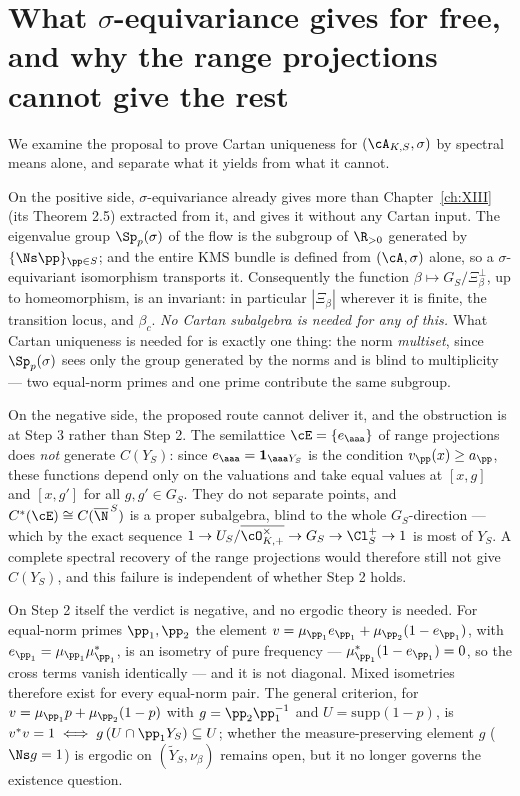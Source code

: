 \chapter[The spectral route to Cartan uniqueness]{What $\sigma$-equivariance gives for free,\\ and why the range projections cannot give the rest}\label{ch:XV}
\begin{summary}
We examine the proposal to prove Cartan uniqueness for $(\cA_{K,S},\sigma)$ by spectral means
alone, and separate what it yields from what it cannot.

On the positive side, $\sigma$-equivariance already gives more than Chapter~\ref{ch:XIII}
(its Theorem 2.5) extracted from it, and gives it without any Cartan input. The eigenvalue
group $\Sp_p(\sigma)$ of the flow is the subgroup of $\R_{>0}$ generated by
$\{\Ns\pp\}_{\pp\in S}$; and the entire $\mathrm{KMS}$
bundle is defined from $(\cA,\sigma)$ alone, so a $\sigma$-equivariant isomorphism transports
it. Consequently the function $\beta\mapsto G_S/\Xi_\beta^\perp$, up to homeomorphism, is an
invariant: in particular $|\Xi_\beta|$ wherever it is finite, the transition locus, and
$\beta_c$. \emph{No Cartan subalgebra is needed for any of this.} What Cartan uniqueness is
needed for is exactly one thing: the norm \emph{multiset}, since $\Sp_p(\sigma)$ sees only the
group generated by the norms and is blind to multiplicity --- two equal-norm primes and one
prime contribute the same subgroup.

On the negative side, the proposed route cannot deliver it, and the obstruction is at Step 3
rather than Step 2. The semilattice $\cE=\{e_\aaa\}$ of range projections does \emph{not}
generate $C(Y_S)$: since $e_\aaa=\mathbf 1_{\aaa Y_S}$ is the condition $v_\pp(x)\ge a_\pp$,
these functions depend only on the valuations and take equal values at $[x,g]$ and $[x,g']$
for all $g,g'\in G_S$. They do not separate points, and $C^*(\cE)\cong C(\overline\N^{\,S})$ is
a proper subalgebra, blind to the whole $G_S$-direction --- which by the exact sequence
$1\to U_S/\overline{\cO^\times_{K,+}}\to G_S\to\Cl^+_S\to1$ is most of $Y_S$. A complete
spectral recovery of the range projections would therefore still not give $C(Y_S)$, and this
failure is independent of whether Step 2 holds.

On Step 2 itself the verdict is negative, and no ergodic theory is needed. For equal-norm
primes $\pp_1,\pp_2$ the element $v=\mu_{\pp_1}e_{\pp_1}+\mu_{\pp_2}(1-e_{\pp_1})$, with
$e_{\pp_1}=\mu_{\pp_1}\mu_{\pp_1}^*$, is an isometry of pure frequency ---
$\mu_{\pp_1}^*(1-e_{\pp_1})=0$, so the cross terms vanish identically --- and it is not
diagonal. Mixed isometries therefore exist for every equal-norm pair. The general criterion,
for $v=\mu_{\pp_1}p+\mu_{\pp_2}(1-p)$ with $g=\pp_2\pp_1^{-1}$ and $U=\mathrm{supp}(1-p)$, is
$v^*v=1\iff g\,(U\cap\pp_1Y_S)\subseteq U$; whether the measure-preserving element $g$
($\Ns g=1$) is ergodic on $(\widetilde Y_S,\nu_\beta)$ remains open, but it no longer
governs the existence question.


\end{summary}

